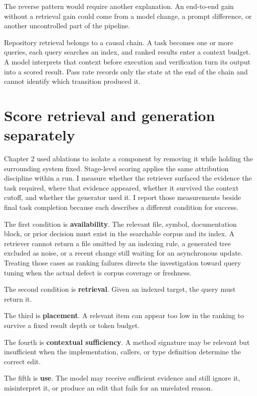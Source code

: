 The reverse pattern would require another explanation. An end-to-end gain without a retrieval gain could come from a model change, a prompt difference, or another uncontrolled part of the pipeline.

Repository retrieval belongs to a causal chain. A task becomes one or more queries, each query searches an index, and ranked results enter a context budget. A model interprets that context before execution and verification turn its output into a scored result. Pass rate records only the state at the end of the chain and cannot identify which transition produced it.

\hypertarget{score-retrieval-and-generation-separately}{%
\section{Score retrieval and generation separately}\label{score-retrieval-and-generation-separately}}

Chapter 2 used ablations to isolate a component by removing it while holding the surrounding system fixed. Stage-level scoring applies the same attribution discipline within a run. I measure whether the retriever surfaced the evidence the task required, where that evidence appeared, whether it survived the context cutoff, and whether the generator used it. I report those measurements beside final task completion because each describes a different condition for success.

The first condition is \textbf{availability}. The relevant file, symbol, documentation block, or prior decision must exist in the searchable corpus and its index. A retriever cannot return a file omitted by an indexing rule, a generated tree excluded as noise, or a recent change still waiting for an asynchronous update. Treating those cases as ranking failures directs the investigation toward query tuning when the actual defect is corpus coverage or freshness.

The second condition is \textbf{retrieval}. Given an indexed target, the query must return it.

The third is \textbf{placement}. A relevant item can appear too low in the ranking to survive a fixed result depth or token budget.

The fourth is \textbf{contextual sufficiency}. A method signature may be relevant but insufficient when the implementation, callers, or type definition determine the correct edit.

The fifth is \textbf{use}. The model may receive sufficient evidence and still ignore it, misinterpret it, or produce an edit that fails for an unrelated reason.

